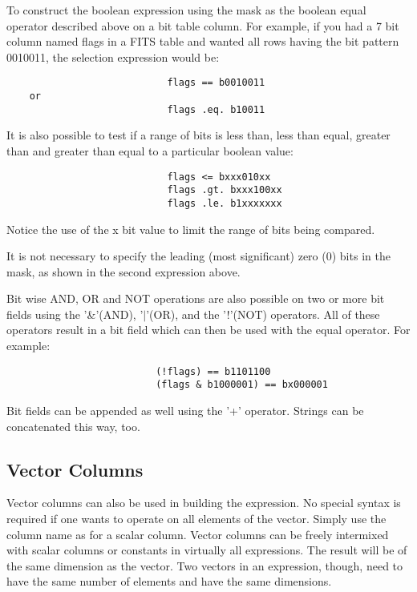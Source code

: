 \documentclass[11pt]{book}
\begin{document}
    To construct the boolean expression using the mask  as  the  boolean
    equal  operator  described above on a bit table column. For example,
    if you had a 7 bit column named flags in a  FITS  table  and  wanted
    all  rows  having  the bit pattern 0010011, the selection expression
    would be:


\begin{verbatim}
                            flags == b0010011
    or
                            flags .eq. b10011
\end{verbatim}

    It is also possible to test if a range of bits is  less  than,  less
    than  equal,  greater  than  and  greater than equal to a particular
    boolean value:


\begin{verbatim}
                            flags <= bxxx010xx
                            flags .gt. bxxx100xx
                            flags .le. b1xxxxxxx
\end{verbatim}

    Notice the use of the x bit value to limit the range of  bits  being
    compared.

    It  is  not necessary to specify the leading (most significant) zero
    (0) bits in the mask, as shown in the second expression above.

    Bit wise AND, OR and NOT operations are  also  possible  on  two  or
    more  bit  fields  using  the  '\&'(AND),  '$|$'(OR),  and the '!'(NOT)
    operators. All of these operators result in a bit  field  which  can
    then be used with the equal operator. For example:


\begin{verbatim}
                          (!flags) == b1101100
                          (flags & b1000001) == bx000001
\end{verbatim}

    Bit  fields can be appended as well using the '+' operator.  Strings
    can be concatenated this way, too.


\subsection{Vector Columns}

    Vector columns can also be used  in  building  the  expression.   No
    special  syntax  is required if one wants to operate on all elements
    of the vector.  Simply use the column name as for a  scalar  column.
    Vector  columns  can  be  freely  intermixed  with scalar columns or
    constants in virtually all expressions.  The result will be  of  the
    same dimension as the vector.  Two vectors in an expression, though,
    need to  have  the  same  number  of  elements  and  have  the  same
    dimensions.
\end{document}
